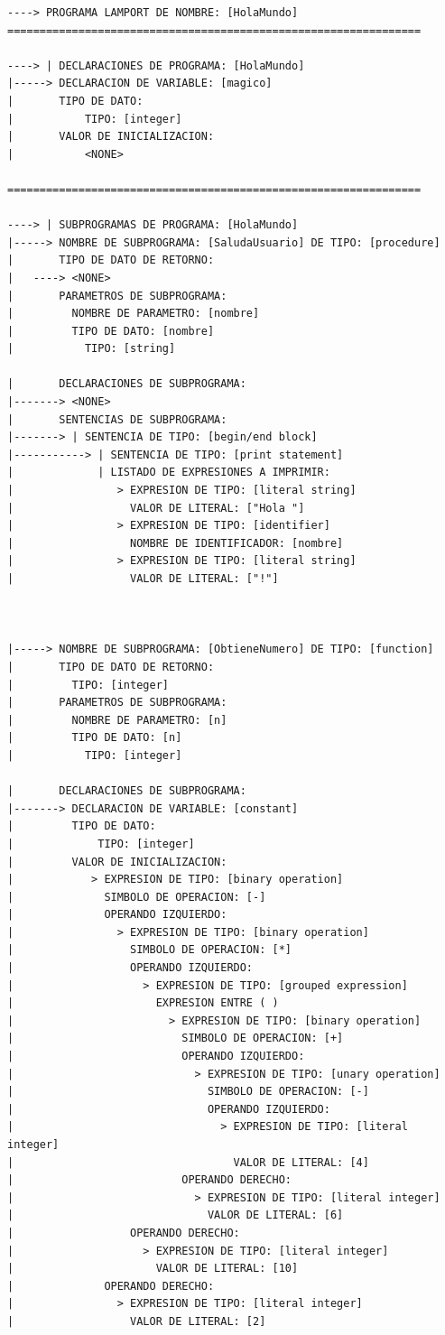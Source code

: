 \begin{verbatim}
----> PROGRAMA LAMPORT DE NOMBRE: [HolaMundo]
================================================================

----> | DECLARACIONES DE PROGRAMA: [HolaMundo]
|-----> DECLARACION DE VARIABLE: [magico]
|       TIPO DE DATO:
|           TIPO: [integer]
|       VALOR DE INICIALIZACION:
|           <NONE>

================================================================

----> | SUBPROGRAMAS DE PROGRAMA: [HolaMundo]
|-----> NOMBRE DE SUBPROGRAMA: [SaludaUsuario] DE TIPO: [procedure]
|       TIPO DE DATO DE RETORNO:
|   ----> <NONE>
|       PARAMETROS DE SUBPROGRAMA:
|         NOMBRE DE PARAMETRO: [nombre]
|         TIPO DE DATO: [nombre]
|           TIPO: [string]

|       DECLARACIONES DE SUBPROGRAMA:
|-------> <NONE>
|       SENTENCIAS DE SUBPROGRAMA:
|-------> | SENTENCIA DE TIPO: [begin/end block]
|-----------> | SENTENCIA DE TIPO: [print statement]
|             | LISTADO DE EXPRESIONES A IMPRIMIR:
|                > EXPRESION DE TIPO: [literal string]
|                  VALOR DE LITERAL: ["Hola "]
|                > EXPRESION DE TIPO: [identifier]
|                  NOMBRE DE IDENTIFICADOR: [nombre]
|                > EXPRESION DE TIPO: [literal string]
|                  VALOR DE LITERAL: ["!"]



|-----> NOMBRE DE SUBPROGRAMA: [ObtieneNumero] DE TIPO: [function]
|       TIPO DE DATO DE RETORNO:
|         TIPO: [integer]
|       PARAMETROS DE SUBPROGRAMA:
|         NOMBRE DE PARAMETRO: [n]
|         TIPO DE DATO: [n]
|           TIPO: [integer]

|       DECLARACIONES DE SUBPROGRAMA:
|-------> DECLARACION DE VARIABLE: [constant]
|         TIPO DE DATO:
|             TIPO: [integer]
|         VALOR DE INICIALIZACION:
|            > EXPRESION DE TIPO: [binary operation]
|              SIMBOLO DE OPERACION: [-]
|              OPERANDO IZQUIERDO:
|                > EXPRESION DE TIPO: [binary operation]
|                  SIMBOLO DE OPERACION: [*]
|                  OPERANDO IZQUIERDO:
|                    > EXPRESION DE TIPO: [grouped expression]
|                      EXPRESION ENTRE ( )
|                        > EXPRESION DE TIPO: [binary operation]
|                          SIMBOLO DE OPERACION: [+]
|                          OPERANDO IZQUIERDO:
|                            > EXPRESION DE TIPO: [unary operation]
|                              SIMBOLO DE OPERACION: [-]
|                              OPERANDO IZQUIERDO:
|                                > EXPRESION DE TIPO: [literal integer]
|                                  VALOR DE LITERAL: [4]
|                          OPERANDO DERECHO:
|                            > EXPRESION DE TIPO: [literal integer]
|                              VALOR DE LITERAL: [6]
|                  OPERANDO DERECHO:
|                    > EXPRESION DE TIPO: [literal integer]
|                      VALOR DE LITERAL: [10]
|              OPERANDO DERECHO:
|                > EXPRESION DE TIPO: [literal integer]
|                  VALOR DE LITERAL: [2]


\end{verbatim}
